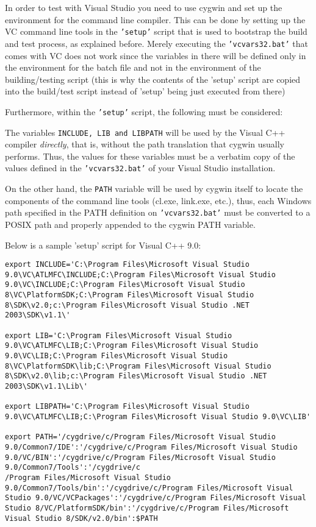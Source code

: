 In order to test with Visual Studio you need to use cygwin and set up
the environment for the command line compiler. This can be done
by setting up the VC command line tools in the {\tt 'setup'} script
that is used to bootstrap the build and test process, as explained before.
Merely executing the {\tt 'vcvars32.bat'} that comes with VC does not work 
since the variables in there will be defined only in the environment for the batch 
file and not in the environment of the building/testing script (this is why
the contents of the 'setup' script are copied into the build/test script 
instead of 'setup' being just executed from there)

Furthermore, within the {\tt 'setup'} script, the following must be
considered: 

The variables {\tt INCLUDE, LIB and LIBPATH} will be used by the Visual C++ compiler
{\em directly}, that is, without the path translation that cygwin usually performs.
Thus, the values for these variables must be a verbatim copy of the values defined in
the {\tt 'vcvars32.bat'} of your Visual Studio installation.

On the other hand, the {\tt PATH} variable will be used by cygwin itself to locate the
components of the command line tools (cl.exe, link.exe, etc.), thus, each Windows
path specified in the PATH definition on {\tt 'vcvars32.bat'} must be converted to a
POSIX path and properly appended to the cygwin PATH variable.

Below is a sample 'setup' script for Visual C++ 9.0:

\begin{verbatim}
export INCLUDE='C:\Program Files\Microsoft Visual Studio 9.0\VC\ATLMFC\INCLUDE;C:\Program Files\Microsoft Visual Studio 9.0\VC\INCLUDE;C:\Program Files\Microsoft Visual Studio 8\VC\PlatformSDK;C:\Program Files\Microsoft Visual Studio 8\SDK\v2.0;c:\Program Files\Microsoft Visual Studio .NET 2003\SDK\v1.1\'

export LIB='C:\Program Files\Microsoft Visual Studio 9.0\VC\ATLMFC\LIB;C:\Program Files\Microsoft Visual Studio 9.0\VC\LIB;C:\Program Files\Microsoft Visual Studio 8\VC\PlatformSDK\lib;C:\Program Files\Microsoft Visual Studio 8\SDK\v2.0\lib;c:\Program Files\Microsoft Visual Studio .NET 2003\SDK\v1.1\Lib\'

export LIBPATH='C:\Program Files\Microsoft Visual Studio 9.0\VC\ATLMFC\LIB;C:\Program Files\Microsoft Visual Studio 9.0\VC\LIB'

export PATH='/cygdrive/c/Program Files/Microsoft Visual Studio 9.0/Common7/IDE':'/cygdrive/c/Program Files/Microsoft Visual Studio 9.0/VC/BIN':'/cygdrive/c/Program Files/Microsoft Visual Studio 9.0/Common7/Tools':'/cygdrive/c
/Program Files/Microsoft Visual Studio 9.0/Common7/Tools/bin':'/cygdrive/c/Program Files/Microsoft Visual Studio 9.0/VC/VCPackages':'/cygdrive/c/Program Files/Microsoft Visual Studio 8/VC/PlatformSDK/bin':'/cygdrive/c/Program Files/Microsoft Visual Studio 8/SDK/v2.0/bin':$PATH

\end{verbatim}


